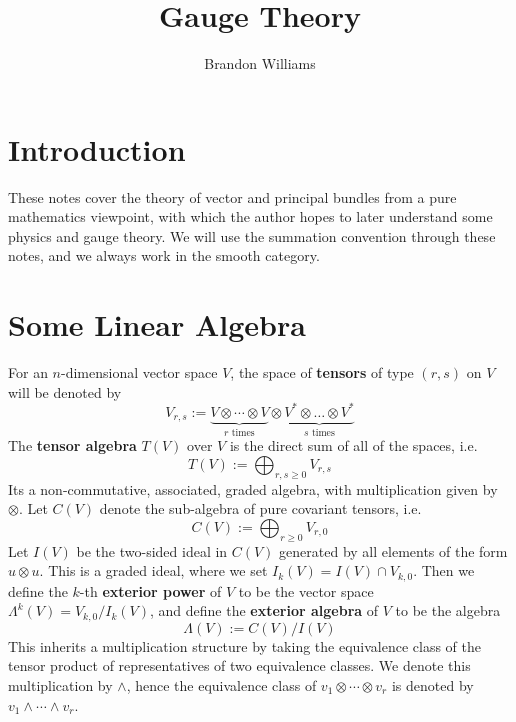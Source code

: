 









\title{\Large Gauge Theory}
\author{\large Brandon Williams}

\maketitle


\tableofcontents


\newpage



\section{Introduction}


These notes cover the theory of vector and principal bundles from a pure mathematics viewpoint, with which the author hopes to later understand some physics and gauge theory. We will use the summation convention through these notes, and we always work in the smooth category.








\section{Some Linear Algebra}
\label{Some Linear Algebra}



For an $n$-dimensional vector space $V$, the space of \textbf{tensors} of type $(r,s)$ on $V$ will be denoted by
\[ V_{r,s} := \underbrace{V \otimes \cdots \otimes V}_{r \text{ times}} \otimes \underbrace{V^* \otimes \ldots \otimes V^*}_{s \text{ times}} \]
The \textbf{tensor algebra} $T(V)$ over $V$ is the direct sum of all of the spaces, i.e.
\[ T(V) := \bigoplus_{r,s \geq 0} V_{r,s} \]
Its a non-commutative, associated, graded algebra, with multiplication given by $\otimes$. Let $C(V)$ denote the sub-algebra of pure covariant tensors, i.e.
\[ C(V) := \bigoplus_{r \geq 0} V_{r,0} \]
Let $I(V)$ be the two-sided ideal in $C(V)$ generated by all elements of the form $u \otimes u$. This is a graded ideal, where we set $I_k(V) = I(V) \cap V_{k,0}$. Then we define the $k$-th \textbf{exterior power} of $V$ to be the vector space $\Lambda^k(V) = V_{k,0} / I_k(V)$, and define the \textbf{exterior algebra} of $V$ to be the algebra
\[ \Lambda(V) := C(V) / I(V) \]
This inherits a multiplication structure by taking the equivalence class of the tensor product of representatives of two equivalence classes. We denote this multiplication by $\wedge$, hence the equivalence class of $v_1 \otimes \cdots \otimes v_r$ is denoted by $v_1 \wedge \cdots \wedge v_r$. 



